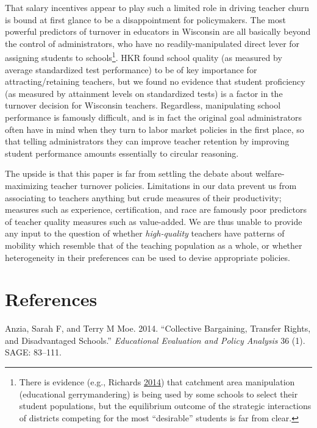 \documentclass[]{article}
\let\rmarkdownfootnote\footnote%
\def\footnote{\protect\rmarkdownfootnote}
\begin{document}
That salary incentives appear to play such a limited role in driving
teacher churn is bound at first glance to be a disappointment for
policymakers. The most powerful predictors of turnover in educators in
Wisconsin are all basically beyond the control of administrators, who
have no readily-manipulated direct lever for assigning students to
schools\footnote{There is evidence (e.g., Richards
  \protect\hyperlink{ref-richards}{2014}) that catchment area
  manipulation (educational gerrymandering) is being used by some
  schools to select their student populations, but the equilibrium
  outcome of the strategic interactions of districts competing for the
  most ``desirable'' students is far from clear.}. HKR found school
quality (as measured by average standardized test performance) to be of
key importance for attracting/retaining teachers, but we found no
evidence that student proficiency (as measured by attainment levels on
standardized tests) is a factor in the turnover decision for Wisconsin
teachers. Regardless, manipulating school performance is famously
difficult, and is in fact the original goal administrators often have in
mind when they turn to labor market policies in the first place, so that
telling administrators they can improve teacher retention by improving
student performance amounts essentially to circular reasoning.

The upside is that this paper is far from settling the debate about
welfare-maximizing teacher turnover policies. Limitations in our data
prevent us from associating to teachers anything but crude measures of
their productivity; measures such as experience, certification, and race
are famously poor predictors of teacher quality measures such as
value-added. We are thus unable to provide any input to the question of
whether \emph{high-quality} teachers have patterns of mobility which
resemble that of the teaching population as a whole, or whether
heterogeneity in their preferences can be used to devise appropriate
policies.

\section*{References}\label{references}

\hypertarget{refs}{}
\hypertarget{ref-anzia}{}
Anzia, Sarah F, and Terry M Moe. 2014. ``Collective Bargaining, Transfer
Rights, and Disadvantaged Schools.'' \emph{Educational Evaluation and
Policy Analysis} 36 (1). SAGE: 83--111.
\end{document}
